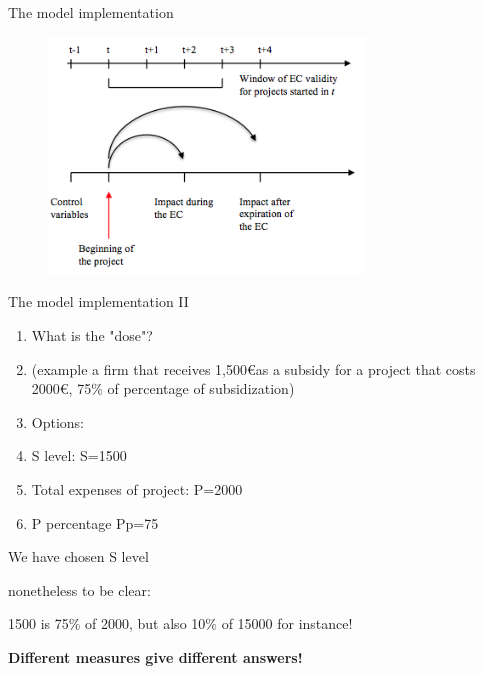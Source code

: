 \documentclass[10pt,handout,xcolor=pdftex,dvipsnames,table]{beamer}
\begin{document}
\begin{frame}{The model implementation}
\begin{figure}[t]
\centering
\includegraphics[width=0.75\textwidth]{./Figs/SchemaMod.png}
\end{figure}
\end{frame}

\begin{frame}{The model implementation II}
\begin{enumerate}
\item What is the "dose"?
\item (example a firm that receives 1,500\euro as a subsidy for a project that costs 2000\euro,  75\% of percentage of subsidization)
\item Options:
\item S level:  S=1500
\item Total expenses of project: P=2000
\item P percentage Pp=75
\end{enumerate}
We have chosen S level

nonetheless to be clear:

1500 is 75\% of 2000, but also 10\% of 15000 for instance!

{\bf Different measures give different answers!}
\end{frame}

\end{document}
